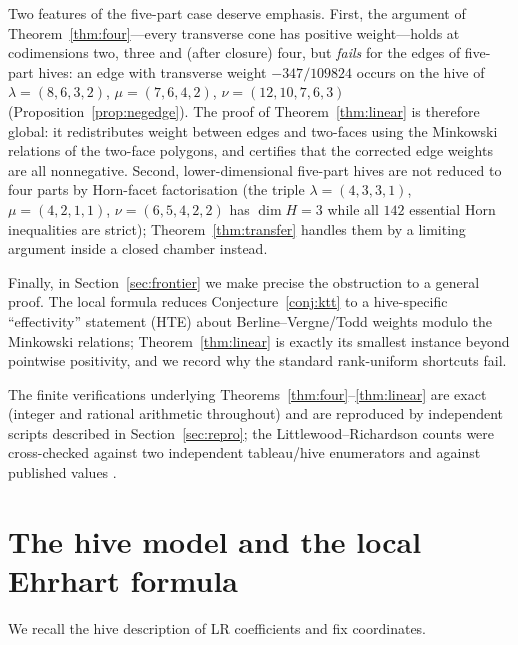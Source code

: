 \documentclass[11pt]{amsart}
\theoremstyle{definition}
\newcommand{\lam}{\lambda}
\begin{document}
Two features of the five-part case deserve emphasis. First, the argument of
Theorem~\ref{thm:four}---every transverse cone has positive weight---holds at
codimensions two, three and (after closure) four, but \emph{fails} for the
edges of five-part hives: an edge with transverse weight $-347/109824$ occurs on
the hive of $\lam=(8,6,3,2)$, $\mu=(7,6,4,2)$, $\nu=(12,10,7,6,3)$
(Proposition~\ref{prop:negedge}). The proof of Theorem~\ref{thm:linear} is
therefore global: it redistributes weight between edges and two-faces using the
Minkowski relations of the two-face polygons, and certifies that the corrected
edge weights are all nonnegative. Second, lower-dimensional five-part hives are
not reduced to four parts by Horn-facet factorisation (the triple
$\lam=(4,3,3,1)$, $\mu=(4,2,1,1)$, $\nu=(6,5,4,2,2)$ has $\dim H=3$ while all
$142$ essential Horn inequalities are strict); Theorem~\ref{thm:transfer}
handles them by a limiting argument inside a closed chamber instead.

Finally, in Section~\ref{sec:frontier} we make precise the obstruction to a
general proof. The local formula reduces Conjecture~\ref{conj:ktt} to a
hive-specific ``effectivity'' statement (HTE) about Berline--Vergne/Todd weights
modulo the Minkowski relations; Theorem~\ref{thm:linear} is exactly its
smallest instance beyond pointwise positivity, and we record why the standard
rank-uniform shortcuts fail.

\medskip

The finite verifications underlying
Theorems~\ref{thm:four}--\ref{thm:linear} are exact (integer and rational
arithmetic throughout) and are reproduced by independent scripts described in
Section~\ref{sec:repro}; the Littlewood--Richardson counts were cross-checked
against two independent tableau/hive enumerators and against published values
\cite{lrcalc}.

\section{The hive model and the local Ehrhart formula}\label{sec:prelim}

We recall the hive description of LR coefficients \cite{KnutsonTao} and fix
coordinates.
\end{document}
